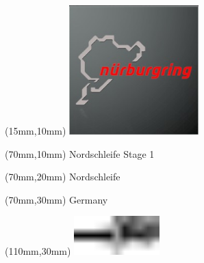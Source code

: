 \null\newpage
\begin{textblock*}{50mm}(15mm,10mm)%
\includegraphics[width=50mm]{LG/2015-05-20_00088.png}
\end{textblock*}
\begin{textblock*}{130mm}(70mm,10mm)%
{\fontsize{20}{20}\selectfont Nordschleife Stage 1}\\
\end{textblock*}
\begin{textblock*}{120mm}(70mm,20mm)%
{\fontsize{16}{16}\selectfont Nordschleife}\\
\end{textblock*}
\begin{textblock*}{120mm}(70mm,30mm)%
{\fontsize{12}{12}\selectfont Germany}
\end{textblock*}
\begin{textblock*}{30mm}(110mm,30mm)%
\centering
\includegraphics[height=15mm]{icons/tofinish.pdf}
\end{textblock*}
